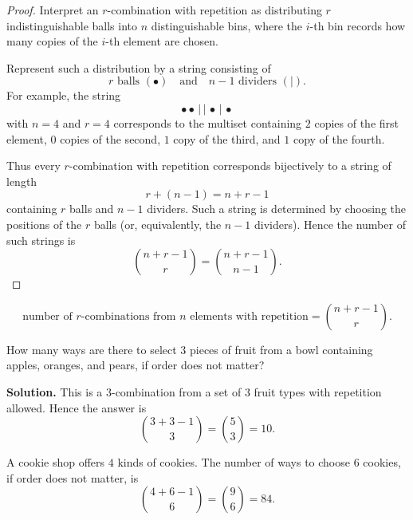 \begin{proof}
Interpret an $r$-combination with repetition as distributing $r$ indistinguishable balls into $n$ distinguishable bins, where the $i$-th bin records how many copies of the $i$-th element are chosen.

Represent such a distribution by a string consisting of
\[
r\text{ balls }(\bullet)\quad\text{and}\quad n-1\text{ dividers }(|).
\]
For example, the string
\[
\bullet\bullet\,|\,|\,\bullet\,|\,\bullet
\]
with $n=4$ and $r=4$ corresponds to the multiset containing $2$ copies of the first element, $0$ copies of the second, $1$ copy of the third, and $1$ copy of the fourth.

Thus every $r$-combination with repetition corresponds bijectively to a string of length
\[
r+(n-1)=n+r-1
\]
containing $r$ balls and $n-1$ dividers. Such a string is determined by choosing the positions of the $r$ balls (or, equivalently, the $n-1$ dividers). Hence the number of such strings is
\[
\binom{n+r-1}{r}=\binom{n+r-1}{n-1}.
\]
\end{proof}

\begin{keyformula}[title={Unordered selection with repetition}]
\[
\text{number of }r\text{-combinations from }n\text{ elements with repetition}
=
\binom{n+r-1}{r}.
\]
\end{keyformula}

\begin{center}
\end{center}

\begin{examplebox}[title={Selecting fruit}]
How many ways are there to select $3$ pieces of fruit from a bowl containing apples, oranges, and pears, if order does not matter?

\textbf{Solution.}
This is a $3$-combination from a set of $3$ fruit types with repetition allowed. Hence the answer is
\[
\binom{3+3-1}{3}=\binom{5}{3}=10.
\]
\end{examplebox}

\begin{examplebox}[title={Cookie shop}]
A cookie shop offers $4$ kinds of cookies. The number of ways to choose $6$ cookies, if order does not matter, is
\[
\binom{4+6-1}{6}=\binom{9}{6}=84.
\]
\end{examplebox}

